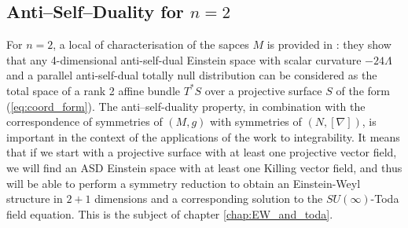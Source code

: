 \subsection{Anti--Self--Duality for $n=2$}
For $n=2$, a local of characterisation of the sapces $M$ is provided in
\cite{DM}: they show that any 4-dimensional anti-self-dual
Einstein space with scalar curvature $-24\Lambda$ and a parallel
anti-self-dual totally null distribution can be considered as the
total space of a rank 2 affine bundle $T^{*}S$ over a projective
surface $S$ of the form (\ref{eq:coord_form}). The anti--self-duality property, in combination with the correspondence of symmetries of $(M,g)$ with symmetries of $(N,[\nabla])$, is important in the context of the applications of
the work \cite{DM} to integrability. It means that
if we start with a projective surface with at least one projective
vector field, we will find an ASD Einstein space with at least one
Killing vector field, and thus will be able to perform a symmetry
reduction to obtain an Einstein-Weyl structure in $2+1$ dimensions
and a corresponding solution to the $SU(\infty)$-Toda field equation. This is the subject of chapter \ref{chap:EW_and_toda}.
